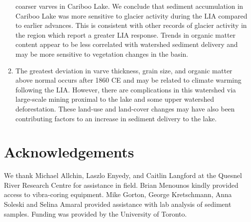 \documentclass[Royal,times,doublespace,sageh]{sagej}
\begin{document}
\begin{enumerate}
  coarser varves in Cariboo Lake. We conclude that sediment accumulation
  in Cariboo Lake was more sensitive to glacier activity during the LIA
  compared to earlier advances. This is consistent with other records of
  glacier activity in the region which report a greater LIA response.
  Trends in organic matter content appear to be less correlated with
  watershed sediment delivery and may be more sensitive to vegetation
  changes in the basin.
\item
  The greatest deviation in varve thickness, grain size, and organic
  matter above normal occurs after 1860 CE and may be related to climate
  warming following the LIA. However, there are complications in this
  watershed via large-scale mining proximal to the lake and some upper
  watershed deforestation. These land-use and land-cover changes may
  have also been contributing factors to an increase in sediment
  delivery to the lake.
\end{enumerate}

\pagebreak

\hypertarget{acknowledgements}{%
\section{Acknowledgements}\label{acknowledgements}}

We thank Michael Allchin, Laszlo Enyedy, and Caitlin Langford at the
Quesnel River Research Centre for assistance in field. Brian Menounos
kindly provided access to vibra-coring equipment. Mike Gorton, George
Kretschmann, Anna Soleski and Selina Amaral provided assistance with lab
analysis of sediment samples. Funding was provided by the University of
Toronto.

\pagebreak



\end{document}
